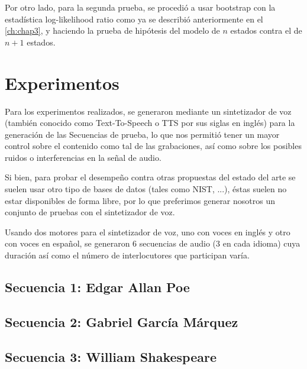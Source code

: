 Por otro lado, para la segunda prueba, se procedió a usar bootstrap con la estadística log-likelihood ratio como ya se describió anteriormente en el \autoref{ch:chap3}, y haciendo la prueba de hipótesis del modelo de $n$ estados contra el de $n+1$ estados.

\section{Experimentos} %
\label{sec:experimentos}

Para los experimentos realizados, se generaron mediante un sintetizador de voz (también conocido como Text-To-Speech o TTS por sus siglas en inglés) para la generación de las Secuencias de prueba, lo que nos permitió tener un mayor control sobre el contenido como tal de las grabaciones, así como sobre los posibles ruidos o interferencias en la señal de audio.

Si bien, para probar el desempeño contra otras propuestas del estado del arte se suelen usar otro tipo de bases de datos (tales como NIST, ...), éstas suelen no estar disponibles de forma libre, por lo que preferimos generar nosotros un conjunto de pruebas con el sintetizador de voz.

Usando dos motores para el sintetizador de voz, uno con voces en inglés y otro con voces en español, se generaron 6 secuencias de audio (3 en cada idioma) cuya duración así como el número de interlocutores que participan varía.

\subsection[Secuencia 1]{Secuencia 1: Edgar Allan Poe} %
\label{ssub:allanpoe}

   


\subsection[Secuencia 2]{Secuencia 2: Gabriel García Márquez} %
\label{ssub:soledad}

   


\subsection[Secuencia 3]{Secuencia 3: William Shakespeare}
\label{ssub:lear}

